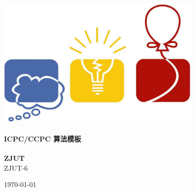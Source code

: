 \documentclass[12pt,a4paper]{article}
\begin{document}
\begin{titlepage}
\begin{center}
\vspace*{0.5cm}
\includegraphics[width=0.75\textwidth]{logo.jpg} \\ [2cm]

\HRule \\ [1cm]
\textbf{\Huge{ICPC/CCPC 算法模板}} \\ [0.5cm]
\HRule \\ [4cm]

\textbf{\Huge{ZJUT}} \\ [1cm]
\LARGE{ZJUT-6}

\vfill
\Large{\today}
\end{center}
\clearpage

\tableofcontents
\pagestyle{empty}
\clearpage
\end{titlepage}


\end{document}
